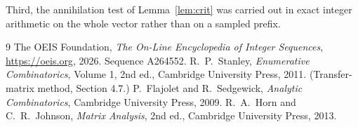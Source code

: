 \documentclass[11pt,a4paper]{article}
\theoremstyle{plain}
\theoremstyle{definition}
\begin{document}
Third, the annihilation test of Lemma~\ref{lem:crit} was carried out in exact integer
arithmetic on the whole vector rather than on a sampled prefix.

\begin{thebibliography}{9}
 The OEIS Foundation, \emph{The On-Line Encyclopedia of Integer
Sequences}, \url{https://oeis.org}, 2026. Sequence A264552.
 R.~P.~Stanley, \emph{Enumerative Combinatorics}, Volume 1, 2nd ed.,
Cambridge University Press, 2011. (Transfer-matrix method, Section 4.7.)
 P.~Flajolet and R.~Sedgewick, \emph{Analytic Combinatorics}, Cambridge
University Press, 2009.
 R.~A.~Horn and C.~R.~Johnson, \emph{Matrix Analysis}, 2nd ed., Cambridge
University Press, 2013.
\end{thebibliography}
\end{document}
